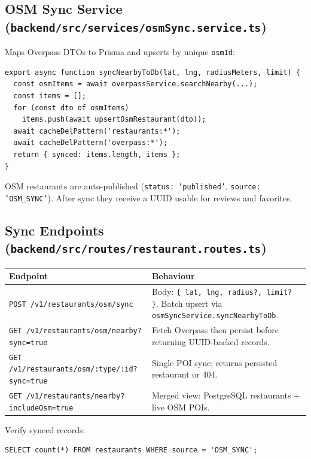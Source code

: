 \documentclass[11pt,a4paper]{article}
\begin{document}
\subsection{OSM Sync Service (\texttt{backend/src/services/osmSync.service.ts})}

Maps Overpass DTOs to Prisma and upserts by unique \texttt{osmId}:

\begin{lstlisting}
export async function syncNearbyToDb(lat, lng, radiusMeters, limit) {
  const osmItems = await overpassService.searchNearby(...);
  const items = [];
  for (const dto of osmItems)
    items.push(await upsertOsmRestaurant(dto));
  await cacheDelPattern('restaurants:*');
  await cacheDelPattern('overpass:*');
  return { synced: items.length, items };
}
\end{lstlisting}

OSM restaurants are auto-published (\texttt{status: 'published'}, \texttt{source: 'OSM\_SYNC'}).
After sync they receive a UUID usable for reviews and favorites.

\subsection{Sync Endpoints (\texttt{backend/src/routes/restaurant.routes.ts})}

\begin{tabular}{@{}p{5.8cm}p{7.2cm}@{}}
\toprule
\textbf{Endpoint} & \textbf{Behaviour} \\
\midrule
\texttt{POST /v1/restaurants/osm/sync} &
  Body: \texttt{\{ lat, lng, radius?, limit? \}}.
  Batch upsert via \texttt{osmSyncService.syncNearbyToDb}. \\
\texttt{GET /v1/restaurants/osm/nearby?sync=true} &
  Fetch Overpass then persist before returning UUID-backed records. \\
\texttt{GET /v1/restaurants/osm/:type/:id?sync=true} &
  Single POI sync; returns persisted restaurant or 404. \\
\texttt{GET /v1/restaurants/nearby?includeOsm=true} &
  Merged view: PostgreSQL restaurants + live OSM POIs. \\
\bottomrule
\end{tabular}

Verify synced records:

\begin{verbatim}
SELECT count(*) FROM restaurants WHERE source = 'OSM_SYNC';
\end{verbatim}
\end{document}
